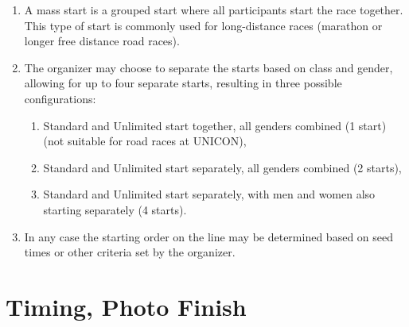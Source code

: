 \begin{enumerate}[leftmargin=1.5em,labelsep=*]
	\item A mass start is a grouped start where all participants start the race together.
	This type of start is commonly used for long-distance races (marathon or longer free distance road races).
	\item The organizer may choose to separate the starts based on class and gender, allowing for up to four separate starts, resulting in three possible configurations:
	\begin{enumerate}[label*=\arabic*,leftmargin=1.5em,labelsep=*]
		\item Standard and Unlimited start together, all genders combined (1 start) (not suitable for road races at UNICON),
		\item Standard and Unlimited start separately, all genders combined (2 starts),
		\item Standard and Unlimited start separately, with men and women also starting separately (4 starts).
	\end{enumerate}
	\item In any case the starting order on the line may be determined based on seed times or other criteria set by the organizer.
\end{enumerate}

\section{Timing, Photo Finish}

